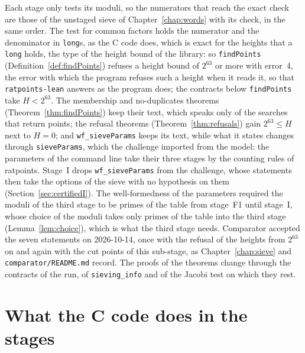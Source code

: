 Each stage only tests its moduli, so the numerators that reach the exact check are those of the
unstaged sieve of Chapter~\ref{chap:words} with its check, in the same order. The test for common
factors holds the numerator and the denominator in \verb|long|s, as the C code does, which is exact
for the heights that a \verb|long| holds, the type of the height bound of the library: so
\verb|findPoints| (Definition~\ref{def:findPoints}) refuses a height bound of $2^{63}$ or more with
error~4, the error with which the program refuses such a height when it reads it, so that
\verb|ratpoints-lean| answers as the program does; the contracts below \verb|findPoints| take
$H < 2^{63}$. The membership and no-duplicates theorems (Theorem~\ref{thm:findPoints}) keep their
text, which speaks only of the searches that return points; the refusal theorems
(Theorem~\ref{thm:refusals}) gain $2^{63} \le H$ next to $H = 0$; and \verb|wf_sieveParams| keeps
its text, while what it states changes through \verb|sieveParams|, which the challenge imported from
the model: the parameters of the command line take their three stages by the counting rules of
ratpoints. Stage~I drops \verb|wf_sieveParams| from the challenge, whose statements then take the
options of the sieve with no hypothesis on them (Section~\ref{sec:certifiedI}). The well-formedness
of the parameters required the moduli of the third stage to be primes of the table from stage~F1
until stage~I, whose choice of the moduli takes only primes of the table into the third stage
(Lemma~\ref{lem:choice}), which is what the third stage needs. Comparator accepted the seven
statements on 2026-10-14, once with the refusal of the heights from $2^{63}$ on and again with the
cut points of this sub-stage, as Chapter~\ref{chap:sieve} and \verb|comparator/README.md| record.
The proofs of the theorems change through the contracts of the run, of \verb|sieving_info| and of
the Jacobi test on which they rest.

\section{What the C code does in the stages}\label{sec:stagesC}

